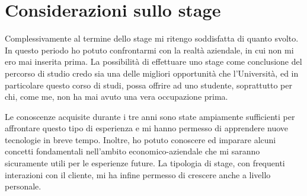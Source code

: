 \section{Considerazioni sullo stage}
Complessivamente al termine dello stage mi ritengo soddisfatta di quanto svolto. In questo periodo ho potuto confrontarmi con la realtà aziendale, in cui non mi ero mai inserita prima. La possibilità di effettuare uno stage come conclusione del percorso di studio credo sia una delle migliori opportunità che l'Università, ed in particolare questo corso di studi, possa offrire ad uno studente, soprattutto per chi, come me, non ha mai avuto una vera occupazione prima. 

Le conoscenze acquisite durante i tre anni sono state ampiamente sufficienti per affrontare questo tipo di esperienza e mi hanno permesso di apprendere nuove tecnologie in breve tempo. Inoltre, ho potuto conoscere ed imparare alcuni concetti fondamentali nell'ambito economico-aziendale che mi saranno sicuramente utili per le esperienze future. La tipologia di stage, con frequenti interazioni con il cliente, mi ha infine permesso di crescere anche a livello personale.
